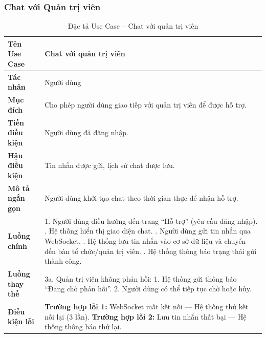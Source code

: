 \subsubsection{Chat với Quản trị viên}
\begin{table}[H]
\centering
\renewcommand{\arraystretch}{1.3}
\setlength{\tabcolsep}{8pt}
\begin{tabularx}{\textwidth}{|l|X|}
\hline
\textbf{Tên Use Case} & Chat với quản trị viên \\ \hline
\textbf{Tác nhân} & Người dùng \\ \hline
\textbf{Mục đích} & Cho phép người dùng giao tiếp với quản trị viên để được hỗ trợ. \\ \hline
\textbf{Tiền điều kiện} & Người dùng đã đăng nhập. \\ \hline
\textbf{Hậu điều kiện} & Tin nhắn được gửi, lịch sử chat được lưu. \\ \hline
\textbf{Mô tả ngắn gọn} & Người dùng khởi tạo chat theo thời gian thực để nhận hỗ trợ. \\ \hline
\textbf{Luồng chính} &
1. Người dùng điều hướng đến trang “Hỗ trợ” (yêu cầu đăng nhập). \newline
2. Hệ thống hiển thị giao diện chat. \newline
3. Người dùng gửi tin nhắn qua WebSocket. \newline
4. Hệ thống lưu tin nhắn vào cơ sở dữ liệu và chuyển đến bàn tổ chức/quản trị viên. \newline
5. Hệ thống thông báo trạng thái gửi thành công. \\ \hline
\textbf{Luồng thay thế} &
3a. Quản trị viên không phản hồi: \newline
\hspace*{1em}1. Hệ thống gửi thông báo “Đang chờ phản hồi”. \newline
\hspace*{1em}2. Người dùng có thể tiếp tục chờ hoặc hủy. \\ \hline
\textbf{Điều kiện lỗi} &
\textbf{Trường hợp lỗi 1:} WebSocket mất kết nối — Hệ thống thử kết nối lại (3 lần). \newline
\textbf{Trường hợp lỗi 2:} Lưu tin nhắn thất bại — Hệ thống thông báo thử lại. \\ \hline
\end{tabularx}
\vspace{15pt}
\caption{Đặc tả Use Case -- Chat với quản trị viên}
\label{tab:uc_chat_admin}
\end{table}

